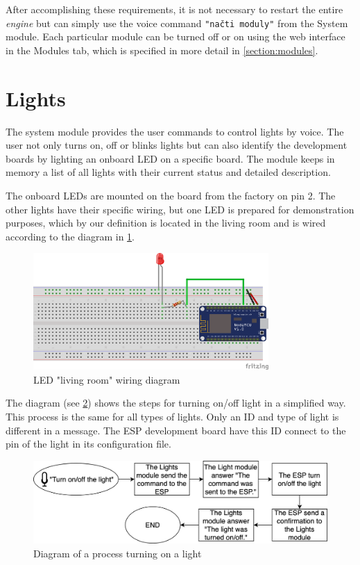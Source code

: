 After accomplishing these requirements, it is not necessary to restart the entire \textit{engine} but can simply use the voice command \texttt{"načti moduly"} from the System module. Each particular module can be turned off or on using the web interface in the Modules tab, which is specified in more detail in \cref{section:modules}.



\section{Lights}

The system module provides the user commands to control lights by voice. The user not only turns on, off or blinks lights but can also identify the development boards by lighting an onboard LED on a specific board. The module keeps in memory a list of all lights with their current status and detailed description.

The onboard LEDs are mounted on the board from the factory on pin 2. The other lights have their specific wiring, but one LED is prepared for demonstration purposes, which by our definition is located in the living room and is wired according to the diagram in \cref{fig:led_schema}. 

\begin{figure}[H]
	\centering
	\includegraphics[width=0.8\textwidth]{img/led_schema.png}
	\caption{LED "living room" wiring diagram}
	\label{fig:led_schema}
\end{figure}

The diagram (see \cref{fig:turn_light_diagram}) shows the steps for turning on/off light in a simplified way. This process is the same for all types of lights. Only an ID and type of light is different in a message. The ESP development board have this ID connect to the pin of the light in its configuration file.

\begin{figure}[H]
    \centering
    \includegraphics[width=\textwidth]{img/turn_light_diagram.png}
    \caption{Diagram of a process turning on a light}
    \label{fig:turn_light_diagram}
\end{figure}

